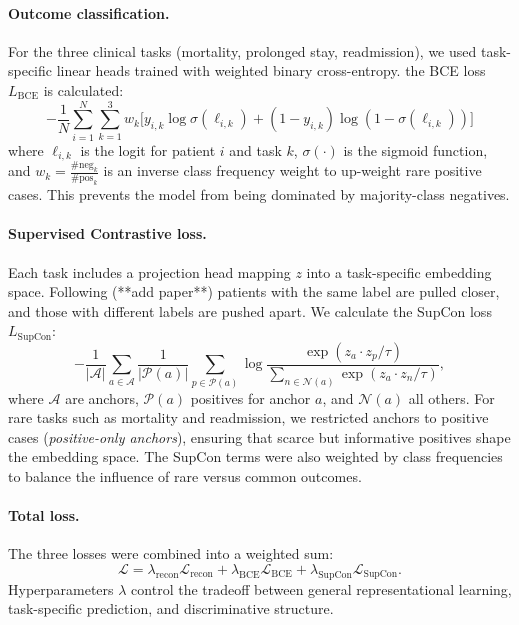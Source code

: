 \documentclass{article}
\theoremstyle{plain}
\theoremstyle{definition}
\theoremstyle{remark}
\begin{document}
\paragraph{Outcome classification.}  
For the three clinical tasks (mortality, prolonged stay, readmission), we used task-specific 
linear heads trained with weighted binary cross-entropy. the BCE loss ${L}_{\text{BCE}}$ is calculated:
\[
    \mathcal - \frac{1}{N}\sum_{i=1}^N \sum_{k=1}^3 w_k
       \Big[ y_{i,k}\log \sigma(\ell_{i,k}) + (1-y_{i,k})\log(1-\sigma(\ell_{i,k})) \Big]
\]
where $\ell_{i,k}$ is the logit for patient $i$ and task $k$, 
$\sigma(\cdot)$ is the sigmoid function, and $w_k = \tfrac{\#\text{neg}_k}{\#\text{pos}_k}$ 
is an inverse class frequency weight to up-weight rare positive cases.  
This prevents the model from being dominated by majority-class negatives.

\paragraph{Supervised Contrastive loss.}  
Each task includes a projection head mapping $z$ into a task-specific embedding space. 
Following (**add paper**) patients with the same label are pulled closer, and those with different labels are pushed apart. We calculate the SupCon loss ${L}_{\text{SupCon}}$:
\[
    \mathcal 
    - \frac{1}{|\mathcal{A}|} \sum_{a \in \mathcal{A}}
    \frac{1}{|\mathcal{P}(a)|} \sum_{p \in \mathcal{P}(a)}
    \log \frac{\exp(z_a \cdot z_p / \tau)}{\sum_{n \in \mathcal{N}(a)} \exp(z_a \cdot z_n / \tau)} ,
\]
where $\mathcal{A}$ are anchors, $\mathcal{P}(a)$ positives for anchor $a$, 
and $\mathcal{N}(a)$ all others. For rare tasks such as mortality and readmission, 
we restricted anchors to positive cases (\textit{positive-only anchors}), ensuring 
that scarce but informative positives shape the embedding space.  
The SupCon terms were also weighted by class frequencies to balance the influence 
of rare versus common outcomes.

\paragraph{Total loss.}  
The three losses were combined into a weighted sum:
\[
    \mathcal{L} = \lambda_{\text{recon}} \mathcal{L}_{\text{recon}} + 
                  \lambda_{\text{BCE}} \mathcal{L}_{\text{BCE}} + 
                  \lambda_{\text{SupCon}} \mathcal{L}_{\text{SupCon}} .
\]
Hyperparameters $\lambda$ control the tradeoff between general representational learning, 
task-specific prediction, and discriminative structure.
\end{document}
